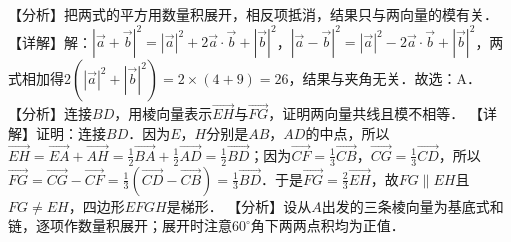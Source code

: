 【分析】把两式的平方用数量积展开，相反项抵消，结果只与两向量的模有关．
【详解】解：\(\left| \overrightarrow{a} + \overrightarrow{b} \right|^{2} = {\left| \overrightarrow{a} \right|^{2}} + 2\overrightarrow{a} \cdot \overrightarrow{b} + {\left| \overrightarrow{b} \right|^{2}}\)，\(\left| \overrightarrow{a} - \overrightarrow{b} \right|^{2} = {\left| \overrightarrow{a} \right|^{2}} - 2\overrightarrow{a} \cdot \overrightarrow{b} + {\left| \overrightarrow{b} \right|^{2}}\)，两式相加得\(2\left( {\left| \overrightarrow{a} \right|^{2}} + {\left| \overrightarrow{b} \right|^{2}} \right) = 2 \times \left( 4 + 9 \right) = 26\)，结果与夹角无关．故选：A．
【分析】连接\(BD\)，用棱向量表示\(\overrightarrow{EH}\)与\(\overrightarrow{FG}\)，证明两向量共线且模不相等．
【详解】证明：连接\(BD\)．因为\(E\)，\(H\)分别是\(AB\)，\(AD\)的中点，所以\(\overrightarrow{EH} = \overrightarrow{EA} + \overrightarrow{AH} = \frac{1}{2}\overrightarrow{BA} + \frac{1}{2}\overrightarrow{AD} = \frac{1}{2}\overrightarrow{BD}\)；因为\(\overrightarrow{CF} = \frac{1}{3}\overrightarrow{CB}\)，\(\overrightarrow{CG} = \frac{1}{3}\overrightarrow{CD}\)，所以\(\overrightarrow{FG} = \overrightarrow{CG} - \overrightarrow{CF} = \frac{1}{3}\left( \overrightarrow{CD} - \overrightarrow{CB} \right) = \frac{1}{3}\overrightarrow{BD}\)．于是\(\overrightarrow{FG} = \frac{2}{3}\overrightarrow{EH}\)，故\(FG \parallel EH\)且\(FG \neq EH\)，四边形\(EFGH\)是梯形．
【分析】设从\(A\)出发的三条棱向量为基底式和链，逐项作数量积展开；展开时注意\(60^{\circ}\)角下两两点积均为正值．

